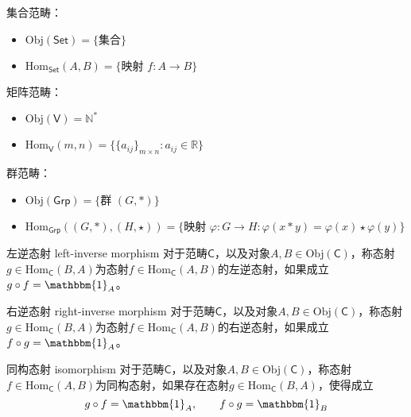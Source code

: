 \documentclass[lang = cn, scheme = chinese, thmcnt = section]{elegantbook}
\newcommand{\N}{\mathbb{N}}            %
\newcommand{\R}{\mathbb{R}}            %
\begin{document}
\begin{example}
	集合范畴：
	\begin{itemize}
		\item $\mathrm{Obj}(\mathsf{Set})=\{ \text{集合} \}$
		\item $\mathrm{Hom}_{\mathsf{Set}}(A,B)=\{ \text{映射 }f:A\to B \}$
	\end{itemize}
\end{example}

\begin{example}
	矩阵范畴：
	\begin{itemize}
		\item $\mathrm{Obj}(\mathsf{V})=\N^*$
		\item $\mathrm{Hom}_{\mathsf{V}}(m,n)=\{ \{a_{ij}\}_{m\times n}:a_{ij}\in\R \}$
	\end{itemize}
\end{example}

\begin{example}
	群范畴：
	\begin{itemize}
		\item $\mathrm{Obj}(\mathsf{Grp})=\{ \text{群 }(G,*) \}$
		\item $\mathrm{Hom}_{\mathsf{Grp}}((G,*),(H,\star))=\{ \text{映射 }\varphi:G\to H:\varphi(x*y)=\varphi(x)\star \varphi(y) \}$
	\end{itemize}
\end{example}

\begin{definition}{左逆态射 left-inverse morphism}
	对于范畴$\mathsf{C}$，以及对象$A,B\in\mathrm{Obj}(\mathsf{C})$，称态射$g\in\mathrm{Hom}_\mathsf{C}(B,A)$为态射$f\in\mathrm{Hom}_\mathsf{C}(A,B)$的左逆态射，如果成立$g\circ f=\mathbbm{1}_A$。
\end{definition}

\begin{definition}{右逆态射 right-inverse morphism}
	对于范畴$\mathsf{C}$，以及对象$A,B\in\mathrm{Obj}(\mathsf{C})$，称态射$g\in\mathrm{Hom}_\mathsf{C}(B,A)$为态射$f\in\mathrm{Hom}_\mathsf{C}(A,B)$的右逆态射，如果成立$f\circ g=\mathbbm{1}_A$。
\end{definition}

\begin{definition}{同构态射 isomorphism}
	对于范畴$\mathsf{C}$，以及对象$A,B\in\mathrm{Obj}(\mathsf{C})$，称态射$f\in\mathrm{Hom}_\mathsf{C}(A,B)$为同构态射，如果存在态射$g\in\mathrm{Hom}_\mathsf{C}(B,A)$，使得成立
	$$
	g\circ f=\mathbbm{1}_A,\qquad f\circ g=\mathbbm{1}_B
	$$
\end{definition}
\end{document}
